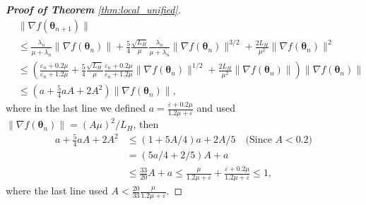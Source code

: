 \documentclass[11pt]{amsart}
\theoremstyle{plain}
\theoremstyle{definition}
\theoremstyle{remark}
\def\eps{\varepsilon}
\def\param{\boldsymbol{\theta}}
\begin{document}
\begin{proof}[\textbf{Proof of Theorem} \ref{thm:local_unified}]
\begin{align*}
     &\|\nabla f(\param_{n+1})\|\\
     &\leq \frac{\overline{\lambda_n}}{\mu+\overline{\lambda_n}}\|\nabla f(\param_n)\|+\frac{5}{4}\frac{\sqrt{L_H}}{\mu}\frac{\overline{\lambda_n}}{\mu+\overline{\lambda_n}}\|\nabla f(\param_n)\|^{3/2}+ \frac{2L_H}{\mu^2}\|\nabla f(\param_n)\|^2\\
     &\leq \left(\frac{\eps_n+0.2\mu}{\eps_n+1.2\mu}+\frac{5}{4}\frac{\sqrt{L_H}}{\mu}\frac{\eps_n+0.2\mu}{\eps_n+1.2\mu}\|\nabla f(\param_n)\|^{1/2}+\frac{2L_H}{\mu^2}\|\nabla f(\param_n)\|\right)\|\nabla f(\param_n)\|\\
     &\leq \left(a+\frac{5}{4}aA+2A^2\right)\|\nabla f(\param_n)\|,
    \end{align*}
    where in the last line we defined $a=\frac{\overline{\eps}+0.2\mu}{1.2\mu+\overline{\eps}}$ and used $\|\nabla f(\param_n)\|=(A\mu)^2/L_H$, then
    \begin{align*}
        a+\frac{5}{4}aA+2A^2
        &\leq (1+5A/4)a+2A/5 \quad \text{(Since $A<0.2$)}\\
        &=(5a/4+2/5)A+a\\
        &\leq \frac{33}{20}A+a \leq \frac{\mu}{1.2\mu+\overline{\eps}}+\frac{\overline{\eps}+0.2\mu}{1.2\mu+\overline{\eps}}\leq 1,
    \end{align*}
    where the last line used $A<\frac{20}{33}\frac{\mu}{1.2\mu+\overline{\eps}}$.
\end{proof}
\end{document}
